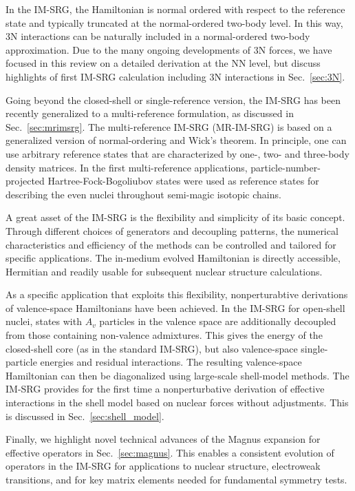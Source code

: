 In the IM-SRG, the Hamiltonian is normal ordered with respect to the
reference state and typically truncated at the normal-ordered two-body
level. In this way, 3N interactions can be naturally included in a
normal-ordered two-body approximation. Due to the many ongoing
developments of 3N forces, we have focused in this review on a
detailed derivation at the NN level, but discuss highlights of first
IM-SRG calculation including 3N interactions in Sec.~\ref{sec:3N}.

Going beyond the closed-shell or single-reference version, the IM-SRG
has been recently generalized to a multi-reference formulation, as
discussed in Sec.~\ref{sec:mrimsrg}. The multi-reference IM-SRG (MR-IM-SRG) is
based on a generalized version of normal-ordering and Wick's
theorem. In principle, one can use 
arbitrary reference states that are
characterized by one-, two- and three-body density matrices. In the
first multi-reference applications, particle-number-projected
Hartree-Fock-Bogoliubov states were used as reference states for
describing the even nuclei throughout semi-magic isotopic chains.

A great asset of the IM-SRG is the flexibility and simplicity of its
basic concept. Through different choices of generators and decoupling
patterns, the numerical characteristics and efficiency of the methods
can be controlled and tailored for specific applications. The
in-medium evolved Hamiltonian is directly accessible, Hermitian and readily
usable for subsequent nuclear structure calculations.

As a specific application that exploits this flexibility,
nonperturabtive derivations of valence-space Hamiltonians have been
achieved. In the IM-SRG for open-shell nuclei, states with $A_v$
particles in the valence space are additionally decoupled from those
containing non-valence admixtures. This gives the energy of the
closed-shell core (as in the standard IM-SRG), but also valence-space
single-particle energies and residual interactions. The resulting
valence-space Hamiltonian can then be diagonalized using large-scale
shell-model methods. The IM-SRG provides for the first time a
nonperturbative derivation of effective interactions in the shell
model based on nuclear forces without adjustments. This is discussed
in Sec.~\ref{sec:shell_model}.

Finally, we highlight novel technical advances of the Magnus expansion
for effective operators in Sec.~\ref{sec:magnus}. This enables a
consistent evolution of operators in the IM-SRG for applications to
nuclear structure, electroweak transitions, and for key matrix elements
needed for fundamental symmetry tests.

